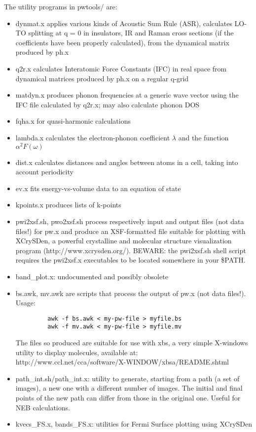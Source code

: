 \documentclass[12pt,a4paper]{article}
\begin{document}
The utility programs in pwtools/ are:
\begin{itemize}
\item dynmat.x applies various kinds of Acoustic Sum Rule (ASR),
  calculates LO-TO splitting at q = 0 in insulators, IR and Raman
  cross sections (if the coefficients have been properly calculated),
  from the dynamical matrix produced by ph.x 
\item q2r.x calculates Interatomic Force Constants (IFC) in real space
  from dynamical matrices produced by ph.x on a regular q-grid 
\item  matdyn.x produces phonon frequencies at a generic wave vector
  using the IFC file calculated by q2r.x; may also calculate phonon DOS 
\item fqha.x for quasi-harmonic calculations 
\item lambda.x calculates the electron-phonon coefficient $\lambda$ and the
  function $\alpha^2F(\omega)$ 
\item dist.x calculates distances and angles between atoms in a cell,
  taking into account periodicity 
\item ev.x fits energy-vs-volume data to an equation of state
\item kpoints.x produces lists of k-points
\item pwi2xsf.sh, pwo2xsf.sh process respectively input and output
  files (not data files!) for pw.x and produce an XSF-formatted file
  suitable for plotting with XCrySDen, a powerful crystalline and
  molecular structure visualization program
  (http://www.xcrysden.org/). BEWARE: the pwi2xsf.sh shell script
  requires the pwi2xsf.x executables to be located somewhere in your
  \$PATH. 
\item band\_plot.x: undocumented and possibly obsolete 
\item bs.awk, mv.awk are scripts that process the output of pw.x (not
data files!). Usage: 
\begin{verbatim}
         awk -f bs.awk < my-pw-file > myfile.bs
         awk -f mv.awk < my-pw-file > myfile.mv
\end{verbatim}
The files so produced are suitable for use with xbs, a very simple
X-windows utility to display molecules, available at:\\
http://www.ccl.net/cca/software/X-WINDOW/xbsa/README.shtml 
\item path\_int.sh/path\_int.x: utility to generate, starting from a
  path (a set of images), a new one with a different number of
  images. The initial and final points of the new path can differ from
  those in the original one. Useful for NEB calculations. 
\item kvecs\_FS.x, bands\_FS.x: utilities for Fermi Surface plotting
  using XCrySDen
\end{itemize}
\end{document}
